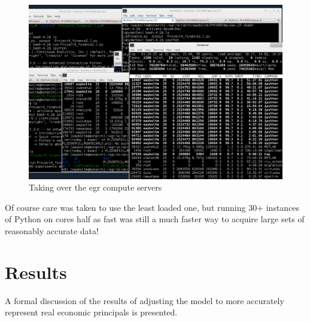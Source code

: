 \documentclass[12pt]{article} %
\begin{document}
\begin{figure}
	\includegraphics[scale=0.5]{LOL.PNG}
	\centering
	\caption{Taking over the egr compute servers}
	\label{fig:computeuse}
\end{figure}

Of course care was taken to use the least loaded one, but running 30+ instances
of Python on cores half as fast was still a much faster way to acquire large
sets of reasonably accurate data!

\section{Results}
A formal discussion of the results of adjusting the model to more accurately
represent real economic principals is presented.
\end{document}
